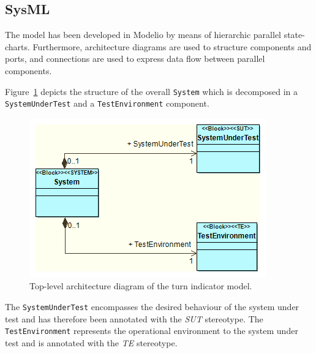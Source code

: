 \subsection{SysML}
The model has been developed in Modelio by means of hierarchic parallel state-charts.
Furthermore, architecture diagrams are used to structure components and
ports, and connections are used to express data flow between parallel components.

Figure~\ref{figure:turnindicator:toplevel-achitecture} depicts the structure of
the overall \texttt{System}  which is decomposed in a
\texttt{SystemUnderTest} and a \texttt{TestEnvironment} component.
\begin{figure}[hpt!]
\centerline{\includegraphics[scale=0.5]{turnindicator/VSI-modelio_turn_indication_small_toplevel_architecture_diagram}}
\caption{Top-level architecture diagram of the turn indicator model.}
\label{figure:turnindicator:toplevel-achitecture}
\end{figure}
The \texttt{SystemUnderTest} encompasses the desired behaviour of the system under test
and has therefore been annotated with the \emph{SUT} stereotype.
The \texttt{TestEnvironment} represents the operational environment to the system under test
and is annotated with the \emph{TE} stereotype.

